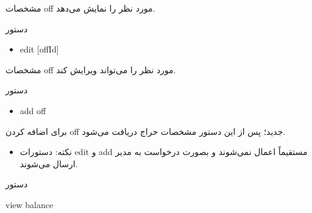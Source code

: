 \documentclass[]{article}
\begin{document}
مشخصات off مورد نظر را نمایش می‌دهد.



\begin{mybox}[colback=brilliantlavender]{دستور}

\begin{latin}

\begin{itemize}[label = {$\Rightarrow$}]

\item
edit [offId]

\end{itemize}

\end{latin}

\end{mybox}

مشخصات off مورد نظر را می‌تواند ویرایش کند.


\begin{mybox}[colback=brilliantlavender]{دستور}

\begin{latin}

\begin{itemize}[label = {$\Rightarrow$}]

\item
add off

\end{itemize}

\end{latin}

\end{mybox}

برای اضافه کردن off جدید؛ پس از این دستور مشخصات حراج دریافت می‌شود.

\begin{itemize}[label={$\blacksquare$}]
\item
نکته: دستورات edit و add مستقیماً اعمال نمی‌شوند و بصورت درخواست به مدیر ارسال می‌شوند.

\end{itemize}


\hrulefill

\begin{mybox}[colback=yellow]{دستور}

\begin{latin}

view balance

\end{latin}

\end{mybox}
\end{document}

